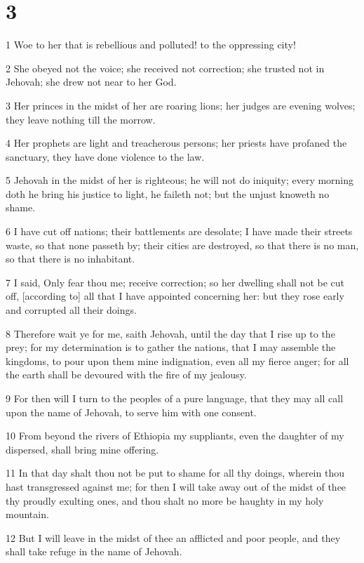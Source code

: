 \chapter{3}

\par 1 Woe to her that is rebellious and polluted! to the oppressing city!
\par 2 She obeyed not the voice; she received not correction; she trusted not in Jehovah; she drew not near to her God.
\par 3 Her princes in the midst of her are roaring lions; her judges are evening wolves; they leave nothing till the morrow.
\par 4 Her prophets are light and treacherous persons; her priests have profaned the sanctuary, they have done violence to the law.
\par 5 Jehovah in the midst of her is righteous; he will not do iniquity; every morning doth he bring his justice to light, he faileth not; but the unjust knoweth no shame.
\par 6 I have cut off nations; their battlements are desolate; I have made their streets waste, so that none passeth by; their cities are destroyed, so that there is no man, so that there is no inhabitant.
\par 7 I said, Only fear thou me; receive correction; so her dwelling shall not be cut off, [according to] all that I have appointed concerning her: but they rose early and corrupted all their doings.
\par 8 Therefore wait ye for me, saith Jehovah, until the day that I rise up to the prey; for my determination is to gather the nations, that I may assemble the kingdoms, to pour upon them mine indignation, even all my fierce anger; for all the earth shall be devoured with the fire of my jealousy.
\par 9 For then will I turn to the peoples of a pure language, that they may all call upon the name of Jehovah, to serve him with one consent.
\par 10 From beyond the rivers of Ethiopia my suppliants, even the daughter of my dispersed, shall bring mine offering.
\par 11 In that day shalt thou not be put to shame for all thy doings, wherein thou hast transgressed against me; for then I will take away out of the midst of thee thy proudly exulting ones, and thou shalt no more be haughty in my holy mountain.
\par 12 But I will leave in the midst of thee an afflicted and poor people, and they shall take refuge in the name of Jehovah.

